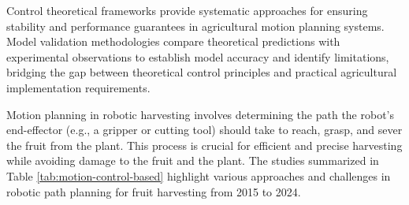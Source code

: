 \documentclass[pdflatex,sn-mathphys-num]{sn-jnl}
\begin{document}
Control theoretical frameworks provide systematic approaches for ensuring stability and performance guarantees in agricultural motion planning systems. Model validation methodologies compare theoretical predictions with experimental observations to establish model accuracy and identify limitations, bridging the gap between theoretical control principles and practical agricultural implementation requirements.

Motion planning in robotic harvesting involves determining the path the robot's end-effector (e.g., a gripper or cutting tool) should take to reach, grasp, and sever the fruit from the plant. This process is crucial for efficient and precise harvesting while avoiding damage to the fruit and the plant. The studies summarized in Table \ref{tab:motion-control-based} highlight various approaches and challenges in robotic path planning for fruit harvesting from 2015 to 2024.
\end{document}
